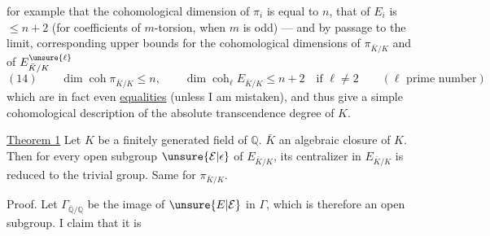for example that the cohomological dimension of $\pi_i$ is equal to $n$, that of $E_i$ is $\leq n+2$ (for coefficients  of $m$-torsion, when $m$ is odd) --- and by passage to the limit, corresponding upper bounds for the cohomological dimensions of $\pi_{\bar K/K}$ and of $E_{\bar K/K}^{\unsure{\ell}}$
\[
(14)\qquad \dim\operatorname{coh}\pi_{\bar K/K}\leq n,\qquad
\dim\operatorname{coh}_{\ell}E_{\bar K/K}\leq n+2\quad\text{if }\ell\neq2
\qquad(\ell\text{ prime number})
\]
which are in fact even \uline{equalities} (unless I am mistaken), and thus give a simple cohomological description of the absolute transcendence degree of $K$.

\uline{Theorem 1} Let $K$ be a finitely generated field  of $\mathbb Q$.  $\bar K$ an algebraic closure of $K$. Then for every open subgroup $\unsure{\mathcal E|\epsilon}$ of $E_{\bar K/K}$, its centralizer in $E_{\bar K/K}$ is reduced to the trivial group. Same for $\pi_{\bar K/K}$.

Proof. Let $\Gamma_{\overline{\mathbb Q}/\mathbb Q}$ be the image of $\unsure{E|\mathcal E}$ in $\Gamma$, which is therefore an open subgroup.   I claim that it is
